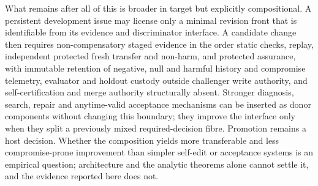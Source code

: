 What remains after all of this is broader in target but explicitly
compositional. A persistent development issue may license only a minimal
revision front that is identifiable from its evidence and discriminator
interface. A candidate change then requires non-compensatory staged evidence in
the order static checks, replay, independent protected fresh transfer and
non-harm, and protected assurance, with immutable retention of negative, null
and harmful history and compromise telemetry, evaluator and holdout custody
outside challenger write authority, and self-certification and merge authority
structurally absent. Stronger diagnosis, search, repair and anytime-valid
acceptance mechanisms can be inserted as donor components without changing
this boundary; they improve the interface only when they split a previously
mixed required-decision fibre. Promotion remains a host decision. Whether the
composition yields more transferable and less compromise-prone improvement
than simpler self-edit or acceptance systems is an empirical question;
architecture and the analytic theorems alone cannot settle it, and the evidence
reported here does not.
